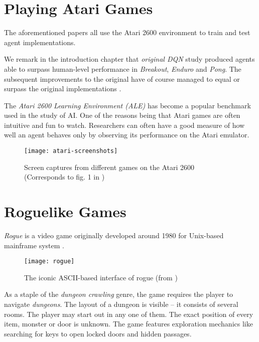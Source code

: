 \section{Playing Atari Games}

The aforementioned papers all use the Atari 2600 environment to train and test agent implementations.

We remark in the introduction chapter that \emph{original DQN} \cite{atari-dqn} study produced agents able to surpass human-level performance in \emph{Breakout}, \emph{Enduro} and \emph{Pong}.
The subsequent improvements to the original have of course managed to equal or surpass the original implementations \cite{ddqn-paper,per-paper}.

The \emph{Atari 2600 Learning Environment (ALE)} \cite{ale-paper} has become a popular benchmark used in the study of AI.
One of the reasons being that Atari games are often intuitive and fun to watch.
Researchers can often have a good measure of how well an agent behaves only by observing its performance on the Atari emulator.

\begin{figure}[]
    \texttt{[image: atari-screenshots]}
    \centering
    \caption{Screen captures from different games on the Atari 2600 (Corresponds to fig. 1 in \cite{atari-dqn})}
    \label{fig:atari-games}
\end{figure}

\section{Roguelike Games}

\emph{Rogue} is a video game originally developed around 1980 for Unix-based mainframe system \cite{wiki:Rogue_(video_game)}.

\begin{figure}[]
    \texttt{[image: rogue]}
    \centering
    \caption{The iconic ASCII-based interface of rogue (from \cite{wiki:Rogue_(video_game)})}
    \label{fig:rogue}
\end{figure}

As a staple of the \emph{dungeon crawling} genre, the game requires the player to navigate \emph{dungeons}.
The layout of a dungeon is visible -- it consists of several rooms.
The player may start out in any one of them.
The exact position of every item, monster or door is unknown.
The game features exploration mechanics like searching for keys to open locked doors and hidden passages.

